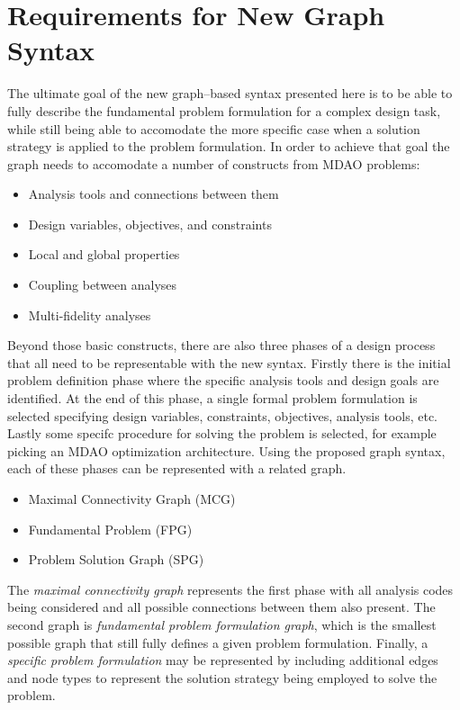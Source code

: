 \newcommand{\st}{ \ | \ }

\section{Requirements for New Graph Syntax}
The ultimate goal of the new graph--based syntax presented here is to be able to 
fully describe the fundamental problem formulation for a complex design task, 
while still being able to accomodate the more specific case when a solution 
strategy is applied to the problem formulation. In order to achieve that goal 
the graph needs to accomodate a number of constructs from MDAO problems: 

\begin{itemize}
    \item Analysis tools and connections between them
    \item Design variables, objectives, and constraints
    \item Local and global properties
    \item Coupling between analyses
    \item Multi-fidelity analyses
\end{itemize}

Beyond those basic constructs, there are also three phases of a design process that 
all need to be representable with the new syntax. Firstly there is the initial problem definition
phase where the specific analysis tools and design goals are identified. At the end of this phase, 
a single formal problem formulation is selected specifying design variables, constraints, objectives, 
analysis tools, etc. Lastly some specifc procedure for solving the problem is selected, for example 
picking an MDAO optimization architecture. Using the proposed graph syntax, each of these phases 
can be represented with a related graph. 

\begin{itemize}
    \item Maximal Connectivity Graph (MCG)
    \item Fundamental Problem  (FPG)
    \item Problem Solution Graph (SPG)
\end{itemize}

The \emph{maximal connectivity graph} represents the first phase with all 
analysis codes being considered and all possible connections between them also present. The second graph 
is \emph{fundamental problem formulation graph}, which is the smallest possible graph 
that still fully defines a given problem formulation. Finally, a \emph{specific problem formulation} 
may be represented by including additional edges and node types to represent the 
solution strategy being employed to solve the problem. 

